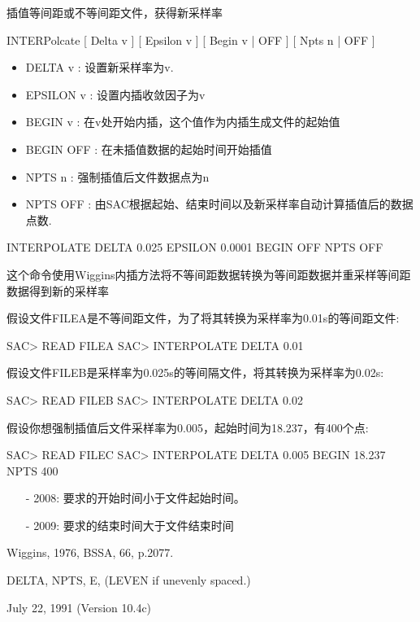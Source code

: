 \label{cmd:interpolate}

插值等间距或不等间距文件，获得新采样率

INTERPolcate [ Delta v ] [ Epsilon v ] [ Begin v | OFF ] [ Npts n | OFF ]

\begin{itemize}
\item DELTA v : 设置新采样率为v.
\item EPSILON v : 设置内插收敛因子为v
\item BEGIN v :  在v处开始内插，这个值作为内插生成文件的起始值 
\item BEGIN OFF : 在未插值数据的起始时间开始插值 
\item NPTS n : 强制插值后文件数据点为n 
\item NPTS OFF : 由SAC根据起始、结束时间以及新采样率自动计算插值后的数据点数. 
\end{itemize}

INTERPOLATE DELTA 0.025 EPSILON 0.0001 BEGIN OFF NPTS OFF

这个命令使用Wiggins内插方法将不等间距数据转换为等间距数据并重采样等间距数据得到新的采样率

假设文件FILEA是不等间距文件，为了将其转换为采样率为0.01s的等间距文件:
\begin{SACCode}
SAC> READ FILEA
SAC> INTERPOLATE DELTA 0.01
\end{SACCode}

假设文件FILEB是采样率为0.025s的等间隔文件，将其转换为采样率为0.02s:
\begin{SACCode}
SAC> READ FILEB
SAC> INTERPOLATE DELTA 0.02
\end{SACCode}

假设你想强制插值后文件采样率为0.005，起始时间为18.237，有400个点:
\begin{SACCode}
SAC> READ FILEC
SAC> INTERPOLATE DELTA 0.005 BEGIN 18.237 NPTS 400
\end{SACCode}

\begin{itemize}
\item[-]2008: 要求的开始时间小于文件起始时间。
\item[-]2009: 要求的结束时间大于文件结束时间
\end{itemize}

Wiggins, 1976, BSSA, 66, p.2077.

DELTA, NPTS, E, (LEVEN if unevenly spaced.)

July 22, 1991 (Version 10.4c)
